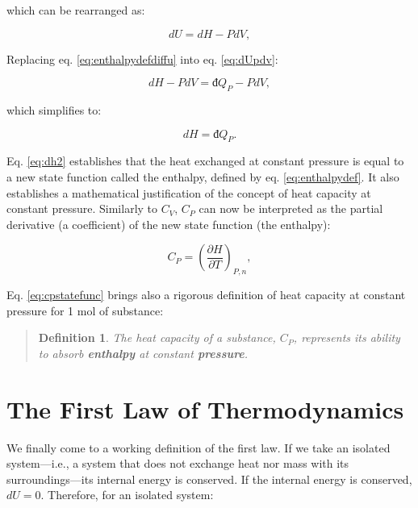 \documentclass[
]{book}
\theoremstyle{definition}
\newtheorem{definition}{Definition}[chapter]
\theoremstyle{definition}
\theoremstyle{definition}
\theoremstyle{remark}
\begin{document}
which can be rearranged as:

\begin{equation}
  dU = dH -PdV,
  \label{eq:enthalpydefdiffu}
\end{equation}

Replacing eq. \eqref{eq:enthalpydefdiffu} into eq. \eqref{eq:dUpdv}:

\begin{equation}
  dH -PdV = đ Q_P - PdV,
  \label{eq:dh1}
\end{equation}

which simplifies to:

\begin{equation}
  dH = đ Q_P.
  \label{eq:dh2}
\end{equation}

Eq. \eqref{eq:dh2} establishes that the heat exchanged at constant pressure is equal to a new state function called the enthalpy, defined by eq. \eqref{eq:enthalpydef}. It also establishes a mathematical justification of the concept of heat capacity at constant pressure. Similarly to \(C_V\), \(C_P\) can now be interpreted as the partial derivative (a coefficient) of the new state function (the enthalpy):

\begin{equation}
  C_P = \left( \frac{\partial H} {\partial T} \right)_{P,n},
  \label{eq:cpstatefunc}
\end{equation}

Eq. \eqref{eq:cpstatefunc} brings also a rigorous definition of heat capacity at constant pressure for 1 mol of substance:

\begin{quote}
\begin{definition}
\protect\hypertarget{def:newdefcp}{}{\label{def:newdefcp} }\emph{The heat capacity of a substance, \(C_P\), represents its ability to absorb \textbf{enthalpy} at constant \textbf{pressure}.}
\end{definition}
\end{quote}

\hypertarget{the-first-law-of-thermodynamics}{%
\section{The First Law of Thermodynamics}\label{the-first-law-of-thermodynamics}}

We finally come to a working definition of the first law. If we take an isolated system---i.e., a system that does not exchange heat nor mass with its surroundings---its internal energy is conserved. If the internal energy is conserved, \(dU=0\). Therefore, for an isolated system:
\end{document}
